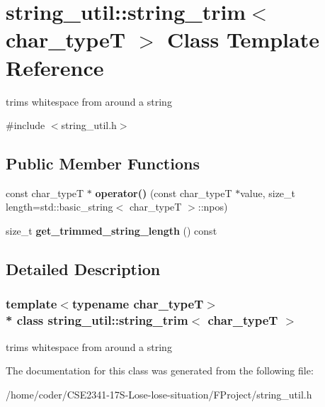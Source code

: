\section{string\+\_\+util\+:\+:string\+\_\+trim$<$ char\+\_\+typeT $>$ Class Template Reference}
\label{classstring__util_1_1string__trim}


trims whitespace from around a string  




{\ttfamily \#include $<$string\+\_\+util.\+h$>$}

\subsection*{Public Member Functions}
\begin{DoxyCompactItemize}
\item 
const char\+\_\+typeT $\ast$ {\bfseries operator()} (const char\+\_\+typeT $\ast$value, size\+\_\+t length=std\+::basic\+\_\+string$<$ char\+\_\+typeT $>$\+::npos)\label{classstring__util_1_1string__trim_a33ce709a5bd7a1fd2d974a0940fc1ff8}

\item 
size\+\_\+t {\bfseries get\+\_\+trimmed\+\_\+string\+\_\+length} () const \label{classstring__util_1_1string__trim_abea837c5d6ef343a91b161d039162ecb}

\end{DoxyCompactItemize}


\subsection{Detailed Description}
\subsubsection*{template$<$typename char\+\_\+typeT$>$\\*
class string\+\_\+util\+::string\+\_\+trim$<$ char\+\_\+type\+T $>$}

trims whitespace from around a string 

The documentation for this class was generated from the following file\+:\begin{DoxyCompactItemize}
\item 
/home/coder/\+C\+S\+E2341-\/17\+S-\/\+Lose-\/lose-\/situation/\+F\+Project/string\+\_\+util.\+h\end{DoxyCompactItemize}
